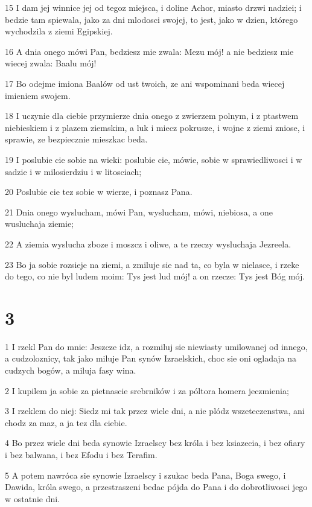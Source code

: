 \par 15 I dam jej winnice jej od tegoz miejsca, i doline Achor, miasto drzwi nadziei; i bedzie tam spiewala, jako za dni mlodosci swojej, to jest, jako w dzien, którego wychodzila z ziemi Egipskiej.
\par 16 A dnia onego mówi Pan, bedziesz mie zwala: Mezu mój! a nie bedziesz mie wiecej zwala: Baalu mój!
\par 17 Bo odejme imiona Baalów od ust twoich, ze ani wspominani beda wiecej imieniem swojem.
\par 18 I uczynie dla ciebie przymierze dnia onego z zwierzem polnym, i z ptastwem niebieskiem i z plazem ziemskim, a luk i miecz pokrusze, i wojne z ziemi zniose, i sprawie, ze bezpiecznie mieszkac beda.
\par 19 I poslubie cie sobie na wieki: poslubie cie, mówie, sobie w sprawiedliwosci i w sadzie i w milosierdziu i w litosciach;
\par 20 Poslubie cie tez sobie w wierze, i poznasz Pana.
\par 21 Dnia onego wyslucham, mówi Pan, wyslucham, mówi, niebiosa, a one wusluchaja ziemie;
\par 22 A ziemia wyslucha zboze i moszcz i oliwe, a te rzeczy wysluchaja Jezreela.
\par 23 Bo ja sobie rozsieje na ziemi, a zmiluje sie nad ta, co byla w nielasce, i rzeke do tego, co nie byl ludem moim: Tys jest lud mój! a on rzecze: Tys jest Bóg mój.

\chapter{3}

\par 1 I rzekl Pan do mnie: Jeszcze idz, a rozmiluj sie niewiasty umilowanej od innego, a cudzoloznicy, tak jako miluje Pan synów Izraelskich, choc sie oni ogladaja na cudzych bogów, a miluja fasy wina.
\par 2 I kupilem ja sobie za pietnascie srebrników i za póltora homera jeczmienia;
\par 3 I rzeklem do niej: Siedz mi tak przez wiele dni, a nie plódz wszeteczenstwa, ani chodz za maz, a ja tez dla ciebie.
\par 4 Bo przez wiele dni beda synowie Izraelscy bez króla i bez ksiazecia, i bez ofiary i bez balwana, i bez Efodu i bez Terafim.
\par 5 A potem nawróca sie synowie Izraelscy i szukac beda Pana, Boga swego, i Dawida, króla swego, a przestraszeni bedac pójda do Pana i do dobrotliwosci jego w ostatnie dni.

